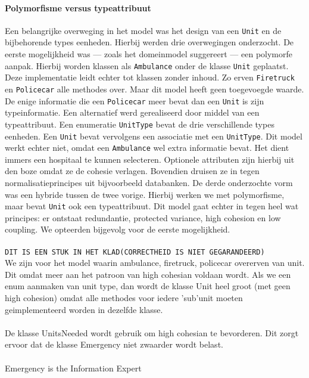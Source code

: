 \paragraph{Polymorfisme versus typeattribuut}
Een belangrijke overweging in het model was het design van een \verb+Unit+ en de bijbehorende types eenheden. Hierbij werden drie overwegingen onderzocht. De eerste mogelijkheid was --- zoals het domeinmodel suggereert --- een polymorfe aanpak. Hierbij worden klassen als \verb+Ambulance+ onder de klasse \verb+Unit+ geplaatst. Deze implementatie leidt echter tot klassen zonder inhoud. Zo erven \verb+Firetruck+ en \verb+Policecar+ alle methodes over. Maar dit model heeft geen toegevoegde waarde. De enige informatie die een \verb+Policecar+ meer bevat dan een \verb+Unit+ is zijn typeinformatie. Een alternatief werd gerealiseerd door middel van een typeattribuut. Een enumeratie \verb+UnitType+ bevat de drie verschillende types eenheden. Een \verb+Unit+ bevat vervolgens een associatie met een \verb+UnitType+. Dit model werkt echter niet, omdat een \verb+Ambulance+ wel extra informatie bevat. Het dient immers een hospitaal te kunnen selecteren. Optionele attributen zijn hierbij uit den boze omdat ze de cohesie verlagen. Bovendien druisen ze in tegen normalisatieprincipes uit bijvoorbeeld databanken. De derde onderzochte vorm was een hybride tussen de twee vorige. Hierbij werken we met polymorfisme, maar bevat \verb+Unit+ ook een typeattribuut. Dit model gaat echter in tegen heel wat principes: er ontstaat redundantie, protected variance, high cohesion en low coupling. We opteerden bijgevolg voor de eerste mogelijkheid.
\paragraph{}

\newpage{}
\paragraph{}
\verb+DIT IS EEN STUK IN HET KLAD(CORRECTHEID IS NIET GEGARANDEERD)+\\
We zijn voor het model waarin ambulance, firetruck, policecar overerven van unit. Dit omdat meer aan het patroon van high cohesian voldaan wordt. Als we een enum aanmaken van unit type, dan wordt de klasse Unit heel groot (met geen high cohesion) omdat alle methodes voor iedere 'sub'unit moeten geimplementeerd worden in dezelfde klasse.\\\\
De klasse UnitsNeeded wordt gebruik om high cohesian te bevorderen. Dit zorgt ervoor dat de klasse Emergency niet zwaarder wordt belast.\\\\
Emergency is the Information Expert

